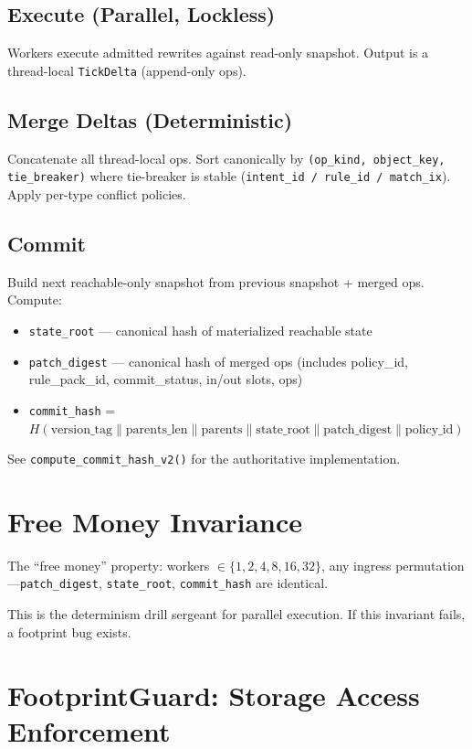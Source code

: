 \subsection{Execute (Parallel, Lockless)}
Workers execute admitted rewrites against read-only snapshot. Output is a thread-local \texttt{TickDelta} (append-only ops).

\subsection{Merge Deltas (Deterministic)}
Concatenate all thread-local ops. Sort canonically by \texttt{(op\_kind, object\_key, tie\_breaker)} where tie-breaker is stable (\texttt{intent\_id / rule\_id / match\_ix}). Apply per-type conflict policies.

\subsection{Commit}
Build next reachable-only snapshot from previous snapshot + merged ops. Compute:
\begin{itemize}
    \item \texttt{state\_root} --- canonical hash of materialized reachable state
    \item \texttt{patch\_digest} --- canonical hash of merged ops (includes policy\_id, rule\_pack\_id, commit\_status, in/out slots, ops)
    \item \texttt{commit\_hash} = $H(\text{version\_tag} \parallel \text{parents\_len} \parallel \text{parents} \parallel \text{state\_root} \parallel \text{patch\_digest} \parallel \text{policy\_id})$
\end{itemize}
See \texttt{compute\_commit\_hash\_v2()} for the authoritative implementation.

\section{Free Money Invariance}

The ``free money'' property: workers $\in \{1, 2, 4, 8, 16, 32\}$, any ingress permutation---\texttt{patch\_digest}, \texttt{state\_root}, \texttt{commit\_hash} are identical.

This is the determinism drill sergeant for parallel execution. If this invariant fails, a footprint bug exists.

\section{FootprintGuard: Storage Access Enforcement}

